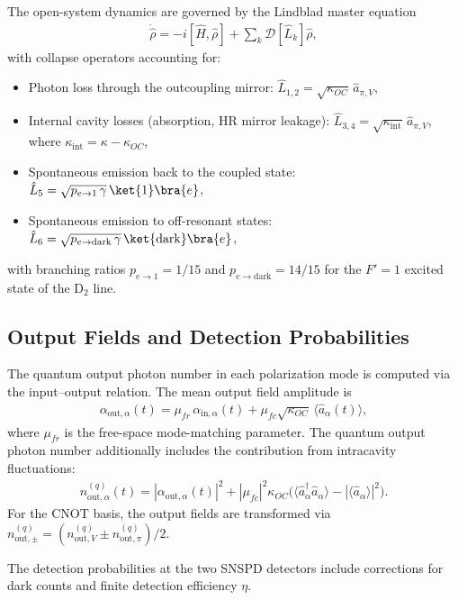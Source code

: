 The open-system dynamics are governed by the Lindblad master equation
\begin{align}
	\dot{\hat{\rho}} = -i[\hat{H}, \hat{\rho}] + \sum_k \mathcal{D}[\hat{L}_k]\hat{\rho},
\end{align}
with collapse operators accounting for:
\begin{itemize}
	\item Photon loss through the outcoupling mirror: $\hat{L}_{1,2} = \sqrt{\kappa_{OC}}\, \hat{a}_{\pi,V}$,
	\item Internal cavity losses (absorption, HR mirror leakage): $\hat{L}_{3,4} = \sqrt{\kappa_{\text{int}}}\, \hat{a}_{\pi,V}$, where $\kappa_{\text{int}} = \kappa - \kappa_{OC}$,
	\item Spontaneous emission back to the coupled state: $\hat{L}_5 = \sqrt{p_{e \to 1}\, \gamma}\, \ket{1}\bra{e}$,
	\item Spontaneous emission to off-resonant states: $\hat{L}_6 = \sqrt{p_{e \to \text{dark}}\, \gamma}\, \ket{\text{dark}}\bra{e}$,
\end{itemize}
with branching ratios $p_{e \to 1} = 1/15$ and $p_{e \to \text{dark}} = 14/15$ for the $F' = 1$ excited state of the D$_2$ line.

\subsection{Output Fields and Detection Probabilities}

The quantum output photon number in each polarization mode is computed via the input--output relation. The mean output field amplitude is
\begin{align}
	\alpha_{\text{out},\alpha}(t) = \mu_{fr}\, \alpha_{\text{in},\alpha}(t) + \mu_{fc}\sqrt{\kappa_{OC}}\, \langle \hat{a}_\alpha(t) \rangle,
\end{align}
where $\mu_{fr}$ is the free-space mode-matching parameter. The quantum output photon number additionally includes the contribution from intracavity fluctuations:
\begin{align}
	n_{\text{out},\alpha}^{(q)}(t) = |\alpha_{\text{out},\alpha}(t)|^2 + |\mu_{fc}|^2 \kappa_{OC}\bigl(\langle \hat{a}_\alpha^\dagger \hat{a}_\alpha \rangle - |\langle \hat{a}_\alpha \rangle|^2\bigr). \label{eq:quantum_output}
\end{align}
For the CNOT basis, the output fields are transformed via $n_{\text{out},\pm}^{(q)} = (n_{\text{out},V}^{(q)} \pm n_{\text{out},\pi}^{(q)})/2$.

The detection probabilities at the two SNSPD detectors include corrections for dark counts and finite detection efficiency $\eta$.

